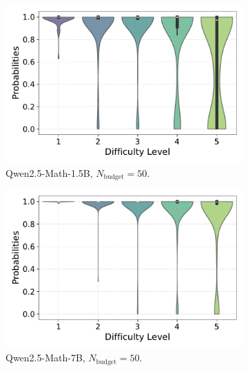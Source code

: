 \begin{figure}[h!]
\begin{subfigure}{0.49\textwidth}
      \includegraphics[width=\textwidth]{figs/QWEN-MATH-1.5B_violin_maj50_probability_adaptive_01_NO_ground_truth.pdf}
        \caption{Qwen2.5-Math-1.5B, $N_{\text{budget}}=50$.}
      \label{fig:QWEN-MATH-1.5B_budget_50_NO_01}
  \end{subfigure}
  \hfill
  \begin{subfigure}{0.49\textwidth}
      \centering
      \includegraphics[width=\textwidth]{figs/QWEN-MATH-7B_violin_maj50_probability_adaptive_01_NO_ground_truth.pdf}
        \caption{Qwen2.5-Math-7B, $N_{\text{budget}}=50$.}
      \label{fig:QWEN-MATH-7B_budget_50_NO_01}
  \end{subfigure}
  \vfill
  \begin{subfigure}{0.49\textwidth}
      \centering

\end{subfigure}
\end{figure}
